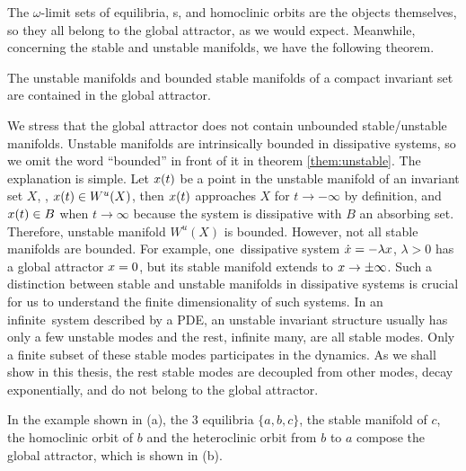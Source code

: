 The $\omega$-limit sets of equilibria, \po s, and homoclinic
orbits are the objects
themselves, so they all belong to the global attractor,
as we would expect. Meanwhile, concerning the stable and unstable manifolds,
we have the following theorem.
\begin{theorem}
  The unstable manifolds and bounded stable manifolds
  of a compact invariant set are contained in the global attractor.
  \label{them:unstable}
\end{theorem}
We stress that the global attractor does not contain unbounded
stable/unstable manifolds. Unstable manifolds are intrinsically bounded
in dissipative systems,
so we omit the word ``bounded'' in front of it in theorem
\ref{them:unstable}. The explanation is simple.
Let $x(t)$  be a point in the unstable manifold of an invariant set $X$, \ie,
$x(t) \in W^{u}(X)$, then $x(t)$ approaches $X$ for $t\to -\infty$ by
definition,
and $x(t) \in B$ when $t\to\infty$ because the system is dissipative with
$B$ an absorbing set. Therefore, unstable manifold $W^u(X)$ is bounded.
However, not all stable manifolds are bounded. For example, one\dmn\
dissipative system $\dot{x} = -\lambda x$, $\lambda>0$
has a global attractor $x=0$, but its stable manifold
extends to $x\to\pm\infty$.
Such a distinction between stable and unstable
manifolds in dissipative systems is crucial for us to understand the finite
dimensionality of such systems.
In an infinite\dmn\ system described by a PDE, an unstable
invariant structure usually has only a few unstable modes and
the rest, infinite many, are all stable modes. Only a finite
subset of these stable modes participates in the dynamics.
As we shall show in this thesis,
the rest stable modes are
decoupled from other modes, decay exponentially, and do not belong to
the global attractor.

In the example shown in (a),
the 3 equilibria $\{a, b, c\}$, the
stable manifold of $c$, the homoclinic orbit of $b$ and the
heteroclinic orbit from $b$ to $a$ compose the global attractor,
which is shown in \reffig{fig:attractor_portrait}(b).


